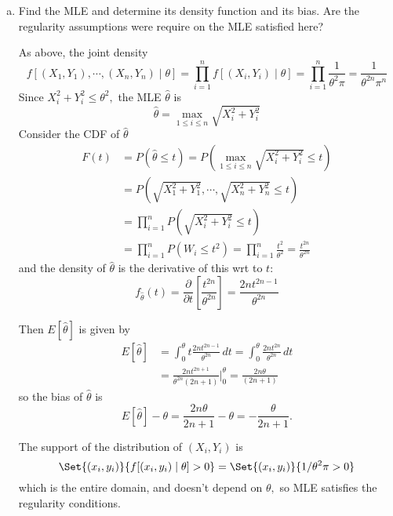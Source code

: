 \documentclass{article}
\begin{document}
\begin{enumerate}
\begin{enumerate}[(a)]
\begin{proof}
				\end{proof}

			\item Find the MLE and determine its density function and its bias. Are the regularity assumptions were require on the MLE satisfied here?
				\begin{soln}
					As above, the joint density \[f\left[ (X_1, Y_1), \cdots, (X_n, Y_n)\mid \theta \right] = \prod_{i=1}^{n}f\left[ (X_i, Y_i)\mid \theta \right]=\prod_{i=1}^{n}\frac{1}{\theta^2\pi} = \frac{1}{\theta^{2n}\pi^{n}}\] Since $X_i^2+Y_i^2\le \theta^2,$ the MLE $\hat{\theta}$ is \[\hat{\theta}=\max_{1\le i\le n} \sqrt{X_i^2+Y_i^2}\] Consider the CDF of $\hat{\theta}$ 
					\begin{align*}
						F(t)&=P(\hat{\theta}\le t) = P\left( \max_{1\le i\le n} \sqrt{X_i^2+Y_i^2} \le t\right) \\
						&= P\left( \sqrt{X_1^2+Y_1^2},\cdots, \displaystyle \sqrt{X_n^2+Y_n^2}\le t \right) \\
						&= \prod_{i=1}^{n}P\left(\sqrt{X_i^2+Y_i^2}\le t\right) \\
						&= \prod_{i=1}^{n} P(W_i\le t^2) = \prod_{i=1}^{n} \frac{t^2}{\theta^2} = \frac{t^{2n}}{\theta^{2n}} 
					\end{align*} and the density of $\hat{\theta}$ is the derivative of this wrt to $t:$
					\[f_{\hat{\theta}}(t) = \frac{\partial}{\partial t}\left[ \frac{t^{2n}}{\theta^{2n}} \right]=\frac{2n t^{2n-1}}{\theta^{2n}}\] 

					Then $E[\hat{\theta}]$ is given by
					\begin{align*}
						E[ \hat{\theta}] &= \int_0^\theta t\frac{2nt^{2n-1}}{\theta^{2n}}\, dt = \int_0^\theta \frac{2nt^{2n}}{\theta^{2n}}\, dt \\
						&= \frac{2nt^{2n+1}}{\theta^{2n}(2n+1)}\bigg\vert_0^\theta =\frac{2n\theta}{(2n+1)} 
					\end{align*} so the bias of $\hat{\theta}$ is \[E[\hat{\theta}]-\theta=\frac{2n\theta}{2n+1}-\theta = -\frac{\theta}{2n+1}.\]

					The support of the distribution of $(X_i, Y_i)$ is \[\Set{(x_i, y_i)}{f[(x_i, y_i)\mid\theta]>0}=\Set{(x_i, y_i)}{1/\theta^2\pi>0}\] which is the entire domain, and doesn't depend on $\theta,$ so MLE satisfies the regularity conditions.
					
				\end{soln}


\end{enumerate}
\end{enumerate}
\end{document}
